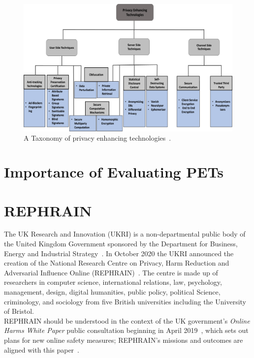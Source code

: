\documentclass[
    author={Jacob Daniel Halsey},
    supervisor={Prof. Awais Rashid},
    degree={BSc},
    title={Building a Testbed for Evaluating Privacy Enhancing Technologies  (PETs)},
    subtitle={},
    type={software development},
    year={2021}
]{dissertation}
\begin{document}
\begin{figure}
	\centering
	\includegraphics{img/pet_taxonomy}
	\caption{A Taxonomy of privacy enhancing technologies~\cite{kaaniche_2020_privacy}.}
	\label{pet_taxonomy}
\end{figure}

\section{Importance of Evaluating PETs}

\section{REPHRAIN}

The UK Research and Innovation (UKRI) is a non-departmental public body of the United Kingdom Government
sponsored by the Department for Business, Energy and Industrial Strategy~\cite{ukri_who_we_are}.
In October 2020 the UKRI announced the creation of the National Research Centre on Privacy, Harm Reduction
and Adversarial Influence Online (REPHRAIN)~\cite{ukri_new_centre}.
The centre is made up of researchers in computer science, international relations, law, psychology, management,
design, digital humanities, public policy, political Science, criminology, and sociology from five British
universities including the University of Bristol. \\

REPHRAIN should be understood in the context of the UK government's \emph{Online Harms White Paper} public
consultation beginning in April 2019~\cite{uk_gov_online_harms}, which sets out plans for new online safety 
measures; REPHRAIN's missions and outcomes are aligned with this paper~\cite{rephrain_harms}. \\
\end{document}

